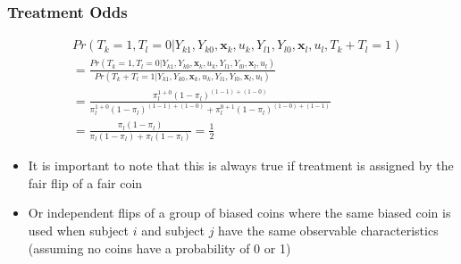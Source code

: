 \documentclass{beamer}
\begin{document}
\begin{frame}[c]\frametitle{Treatment Odds}
	
	\begin{align*}
	&  Pr(T_k = 1, T_l = 0 | Y_{k1}, Y_{k0}, \mathbf{x}_k, u_k, Y_{l1}, Y_{l0}, \mathbf{x}_l, u_l, T_k + T_l = 1) \\
	&=\frac{Pr(T_k = 1, T_l = 0 | Y_{k1}, Y_{k0}, \mathbf{x}_k, u_k, Y_{l1}, Y_{l0}, \mathbf{x}_l, u_l)}{Pr(T_k + T_l = 1 | Y_{k1}, Y_{k0}, \mathbf{x}_k, u_k, Y_{l1}, Y_{l0}, \mathbf{x}_l, u_l)} \\
	&= \frac{\pi_l^{1 + 0}(1 - \pi_l)^{(1 -1) + (1 - 0)}}{\pi_l^{1 + 0}(1 - \pi_l)^{(1 - 1) + (1 - 0)} + \pi_l^{0 + 1}(1 - \pi_l)^{(1 - 0) + (1 - 1)}} \\
	&= \frac{\pi_l(1 - \pi_l)}{\pi_l(1 - \pi_l) + \pi_l(1 - \pi_l)} = \frac{1}{2}
	\end{align*}
	\begin{itemize}
		\item<+-> It is important to note that this is always true if treatment is assigned by the fair flip of a fair coin
		\item<+-> Or independent flips of a group of biased coins where the same biased coin is used when subject $i$ and subject $j$ have the same observable characteristics (assuming no coins have a probability of 0 or 1)
	\end{itemize}
	
\end{frame}
\end{document}
